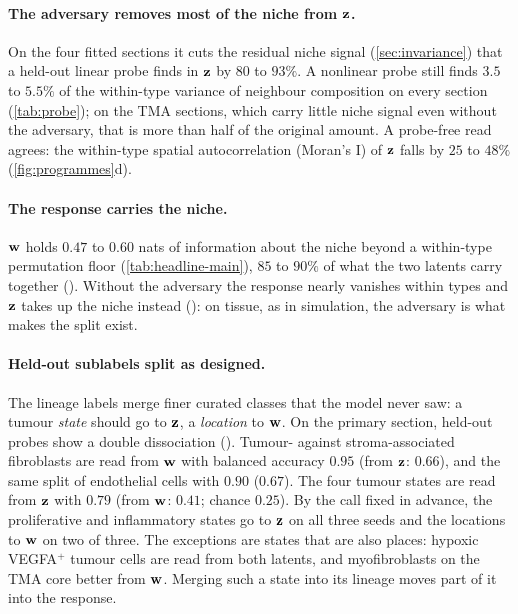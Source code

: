 \paragraph{The adversary removes most of the niche from $\mathbf{z}$.}
On the four fitted sections it cuts the residual niche signal (\cref{sec:invariance}) that a held-out linear probe finds in $\mathbf{z}$ by $80$ to $93\%$. A nonlinear probe still finds $3.5$ to $5.5\%$ of the within-type variance of neighbour composition on every section (\cref{tab:probe}); on the TMA sections, which carry little niche signal even without the adversary, that is more than half of the original amount. A probe-free read agrees: the within-type spatial autocorrelation (Moran's I) of $\mathbf{z}$ falls by $25$ to $48\%$ (\cref{fig:programmes}d).

\paragraph{The response carries the niche.}
$\mathbf{w}$ holds $0.47$ to $0.60$ nats of information about the niche beyond a within-type permutation floor (\cref{tab:headline-main}), $85$ to $90\%$ of what the two latents carry together (). Without the adversary the response nearly vanishes within types and $\mathbf{z}$ takes up the niche instead (): on tissue, as in simulation, the adversary is what makes the split exist.

\paragraph{Held-out sublabels split as designed.}
The lineage labels merge finer curated classes that the model never saw: a tumour \emph{state} should go to $\mathbf{z}$, a \emph{location} to $\mathbf{w}$. On the primary section, held-out probes show a double dissociation (). Tumour- against stroma-associated fibroblasts are read from $\mathbf{w}$ with balanced accuracy $0.95$ (from $\mathbf{z}$: $0.66$), and the same split of endothelial cells with $0.90$ ($0.67$). The four tumour states are read from $\mathbf{z}$ with $0.79$ (from $\mathbf{w}$: $0.41$; chance $0.25$). By the call fixed in advance, the proliferative and inflammatory states go to $\mathbf{z}$ on all three seeds and the locations to $\mathbf{w}$ on two of three. The exceptions are states that are also places: hypoxic VEGFA$^+$ tumour cells are read from both latents, and myofibroblasts on the TMA core better from $\mathbf{w}$. Merging such a state into its lineage moves part of it into the response.

